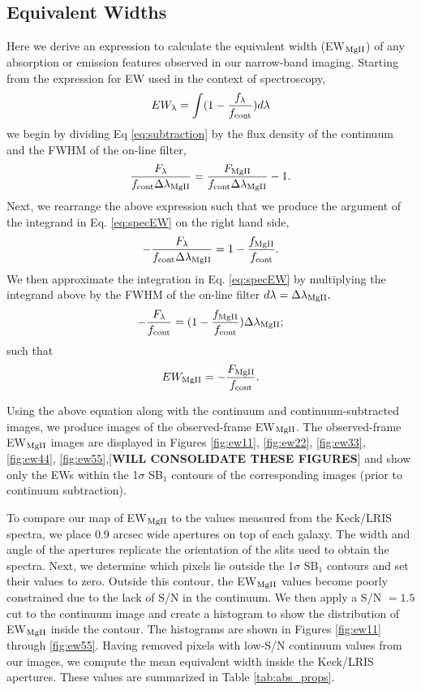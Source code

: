 \documentclass[twocolumn]{aastex61}
\begin{document}
\subsection{Equivalent Widths}\label{subsec.ew}
Here we derive an expression to calculate the equivalent width (EW$_{\rm{MgII}}$) of any absorption or emission features observed in our narrow-band imaging. Starting from the expression for EW used in the context of spectroscopy,
\begin{equation}
EW_{\lambda}=\int (1-\frac{f_{\lambda}}{f_{\rm{cont}}})d\lambda
\label{eq:specEW}
\end{equation}
we begin by dividing Eq \ref{eq:subtraction} by the flux density of the continuum and the FWHM of the on-line filter,
\begin{equation}
\frac{F_{\lambda}}{f_{\rm{cont}}\Delta \lambda_{\rm{MgII}}}=\frac{F_{\rm{MgII}}}{f_{\rm{cont}}\Delta \lambda_{\rm{MgII}}}- 1.
\end{equation}
Next, we rearrange the above expression such that we produce the argument of the integrand in Eq. \ref{eq:specEW} on the right hand side,
\begin{equation}
-\frac{F_{\lambda}}{f_{\rm{cont}}\Delta \lambda_{\rm{MgII}}}=1-\frac{f_{\rm{MgII}}}{f_{\rm{cont}}}.
\end{equation}
We then approximate the integration in Eq. \ref{eq:specEW} by multiplying the integrand above by the FWHM of the on-line filter $d\lambda=\Delta \lambda_{\rm{MgII}},$
\begin{equation}
-\frac{F_{\lambda}}{f_{\rm{cont}}}=(1-\frac{f_{\rm{MgII}}}{f_{\rm{cont}}})\Delta \lambda_{\rm{MgII}};
\end{equation}
such that
\begin{equation}
EW_{\rm{MgII}}=-\frac{F_{\rm{MgII}}}{f_{\rm{cont}}}.
\end{equation}

Using the above equation along with the continuum and continuum-subtracted images, we produce images of the observed-frame EW$_{\rm{MgII}}$. The observed-frame  EW$_{\rm{MgII}}$ images are displayed in Figures \ref{fig:ew11}, \ref{fig:ew22}, \ref{fig:ew33}, \ref{fig:ew44}, \ref{fig:ew55},[\textbf{WILL CONSOLIDATE THESE FIGURES}] and show only the EWs within the 1$\sigma$ SB$_1$ contours of the corresponding  images (prior to continuum subtraction). 

To compare our map of EW$_{\rm{MgII}}$ to the values measured from the Keck/LRIS spectra, we place 0.9 arcsec wide apertures on top of each galaxy. The width and angle of the apertures replicate the orientation of the slits used to obtain the spectra. Next, we determine which pixels lie outside the 1$\sigma$ SB$_1$ contours and set their values to zero. Outside this contour, the EW$_{\rm{MgII}}$ values become poorly constrained due to the lack of S/N in the continuum. We then apply a S/N $= 1.5$ cut to the continuum image and create a histogram to show the distribution of EW$_{\rm{MgII}}$ inside the contour. The histograms are shown in Figures \ref{fig:ew11} through \ref{fig:ew55}. Having removed pixels with low-S/N continuum values from our images, we compute the mean equivalent width inside the Keck/LRIS apertures. These values are summarized in Table \ref{tab:abs_props}.
 
\end{document}
